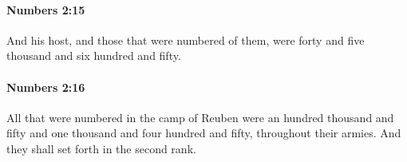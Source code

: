 		\paragraph{Numbers 2:15} %
			\label{NUMBERS-2-15}

			And his host, and those that were numbered of them, were forty and five thousand and six hundred and fifty.


		\paragraph{Numbers 2:16} %
			\label{NUMBERS-2-16}

			All that were numbered in the camp of Reuben were an hundred thousand and fifty and one thousand and four hundred and fifty, throughout their armies. And they shall set forth in the second rank.


